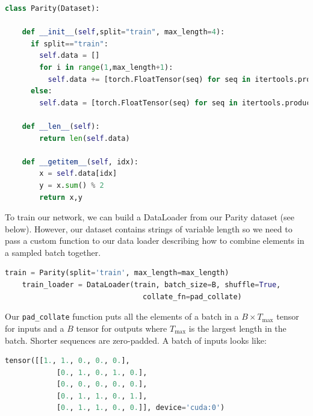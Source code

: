 \documentclass[a4paper,10pt]{article}
\begin{document}
\begin{center}
\begin{minipage}{0.8\textwidth}
\begin{lstlisting}[language=Python, caption=Parity Dataset]
class Parity(Dataset):

    def __init__(self,split="train", max_length=4):
      if split=="train":
        self.data = []
        for i in range(1,max_length+1):
          self.data += [torch.FloatTensor(seq) for seq in itertools.product([0,1], repeat=i)]
      else:
        self.data = [torch.FloatTensor(seq) for seq in itertools.product([0,1], repeat=max_length)]

    def __len__(self):
        return len(self.data)

    def __getitem__(self, idx):
        x = self.data[idx]
        y = x.sum() % 2
        return x,y 
\end{lstlisting}
\end{minipage}
\end{center}

\noindent To train our network, we can build a DataLoader from our Parity dataset (see below). However, our dataset contains strings of variable length so we need to pass a custom function to our data loader describing how to combine elements in a sampled batch together.


\begin{center}
\begin{minipage}{0.8\textwidth}
\begin{lstlisting}[language=Python, caption=Data loader]
    train = Parity(split='train', max_length=max_length)
    train_loader = DataLoader(train, batch_size=B, shuffle=True,
                                collate_fn=pad_collate)
\end{lstlisting}
\end{minipage}
\end{center}

\noindent Our \texttt{pad\_collate} function puts all the elements of a batch in a $B \times T_{\mbox{max}}$ tensor for inputs and a $B$ tensor for outputs where $T_{\mbox{max}}$ is the largest length in the batch. Shorter sequences are zero-padded. A batch of inputs looks like: 

\begin{center}
\begin{minipage}{0.8\textwidth}
\begin{lstlisting}[language=Python, caption=Example input for a batc]
    tensor([[1., 1., 0., 0., 0.],
            [0., 1., 0., 1., 0.],
            [0., 0., 0., 0., 0.],
            [0., 1., 1., 0., 1.],
            [0., 1., 1., 0., 0.]], device='cuda:0')
\end{lstlisting}
\end{minipage}
\end{center}
\end{document}
